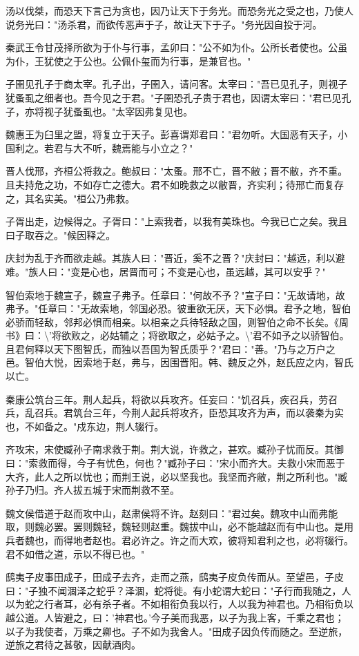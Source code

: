 \documentclass[]{article}
\begin{document}
汤以伐桀，而恐天下言己为贪也，因乃让天下于务光。而恐务光之受之也，乃使人说务光曰："汤杀君，而欲传恶声于子，故让天下于子。"务光因自投于河。

秦武王令甘茂择所欲为于仆与行事，孟卯曰："公不如为仆。公所长者使也。公虽为仆，王犹使之于公也。公佩仆玺而为行事，是兼官也。"

子圉见孔子于商太宰。孔子出，子圉入，请问客。太宰曰："吾已见孔子，则视子犹蚤虱之细者也。吾今见之于君。"子圉恐孔子贵于君也，因谓太宰曰："君已见孔子，亦将视子犹蚤虱也。"太宰因弗复见也。

魏惠王为臼里之盟，将复立于天子。彭喜谓郑君曰："君勿听。大国恶有天子，小国利之。若君与大不听，魏焉能与小立之？"

晋人伐邢，齐桓公将救之。鲍叔曰："太蚤。邢不亡，晋不敝；晋不敝，齐不重。且夫持危之功，不如存亡之德大。君不如晚救之以敝晋，齐实利；待邢亡而复存之，其名实美。"桓公乃弗救。

子胥出走，边候得之。子胥曰："上索我者，以我有美珠也。今我已亡之矣。我且曰子取吞之。"候因释之。

庆封为乱于齐而欲走越。其族人曰："晋近，奚不之晋？"庆封曰："越远，利以避难。"族人曰："变是心也，居晋而可；不变是心也，虽远越，其可以安乎？"

智伯索地于魏宣子，魏宣子弗予。任章曰："何故不予？"宣子曰："无故请地，故弗予。"任章曰："无故索地，邻国必恐。彼重欲无厌，天下必惧。君予之地，智伯必骄而轻敌，邻邦必惧而相亲。以相亲之兵待轻敌之国，则智伯之命不长矣。《周书》曰：\textbackslash{}'将欲败之，必姑辅之；将欲取之，必姑予之。\textbackslash{}'君不如予之以骄智伯。且君何释以天下图智氏，而独以吾国为智氏质乎？"君曰："善。"乃与之万户之邑。智伯大悦，因索地于赵，弗与，因围晋阳。韩、魏反之外，赵氏应之内，智氏以亡。

秦康公筑台三年。荆人起兵，将欲以兵攻齐。任妄曰："饥召兵，疾召兵，劳召兵，乱召兵。君筑台三年，今荆人起兵将攻齐，臣恐其攻齐为声，而以袭秦为实也，不如备之。"戍东边，荆人辍行。

齐攻宋，宋使臧孙子南求救于荆。荆大说，许救之，甚欢。臧孙子忧而反。其御曰："索救而得，今子有忧色，何也？"臧孙子曰："宋小而齐大。夫救小宋而恶于大齐，此人之所以忧也；而荆王说，必以坚我也。我坚而齐敝，荆之所利也。"臧孙子乃归。齐人拔五城于宋而荆救不至。

魏文侯借道于赵而攻中山，赵肃侯将不许。赵刻曰："君过矣。魏攻中山而弗能取，则魏必罢。罢则魏轻，魏轻则赵重。魏拔中山，必不能越赵而有中山也。是用兵者魏也，而得地者赵也。君必许之。许之而大欢，彼将知君利之也，必将辍行。君不如借之道，示以不得已也。"

鸱夷子皮事田成子，田成子去齐，走而之燕，鸱夷子皮负传而从。至望邑，子皮曰："子独不闻涸泽之蛇乎？泽涸，蛇将徙。有小蛇谓大蛇曰："子行而我随之，人以为蛇之行者耳，必有杀子者。不如相衔负我以行，人以我为神君也。乃相衔负以越公道。人皆避之，曰：'神君也。'今子美而我恶，以子为我上客，千乘之君也；以子为我使者，万乘之卿也。子不如为我舍人。"田成子因负传而随之。至逆旅，逆旅之君待之甚敬，因献酒肉。
\end{document}
